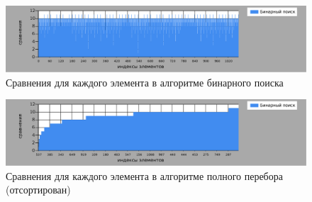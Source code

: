 \begin{figure}
    \centering
    \includegraphics[width=1\linewidth]{img/chart2.eps}
    \caption{Сравнения для каждого элемента в алгоритме бинарного поиска}
    \label{fig:diag-2}
\end{figure}

\begin{figure}
    \centering
    \includegraphics[width=1\linewidth]{img/chart3.eps}
    \caption{Сравнения для каждого элемента в алгоритме полного перебора (отсортирован)}
    \label{fig:diag-3}
\end{figure}

\clearpage




